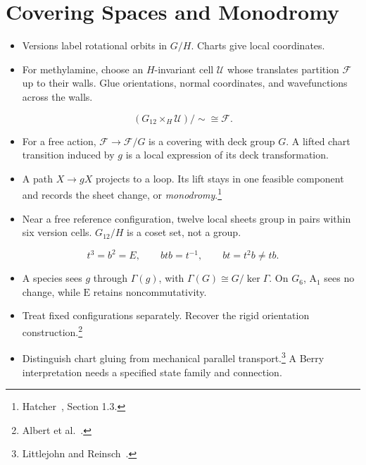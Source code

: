 \documentclass[12pt]{article}
\begin{document}
\section{Covering Spaces and Monodromy}
\begin{itemize}
\item Versions label rotational orbits in $G/H$. Charts give local coordinates.
\item For methylamine, choose an $H$-invariant cell $\mathcal U$ whose
translates partition $\mathcal F$ up to their walls. Glue orientations,
normal coordinates, and wavefunctions across the walls.
\end{itemize}
\[
(G_{12}\times_H\mathcal U)/{\sim}\cong\mathcal F.
\]

\begin{itemize}
\item For a free action, $\mathcal F\to\mathcal F/G$ is a covering
with deck group $G$. A lifted chart transition induced by $g$
is a local expression of its deck transformation.
\item A path $X\to gX$ projects to a loop. Its lift stays in one
feasible component and records the sheet change, or
\emph{monodromy}.\footnote{Hatcher~\cite{Hatcher2002}, Section 1.3.}
\item Near a free reference configuration, twelve local sheets group
in pairs within six version cells. $G_{12}/H$ is a coset set, not a group.
\end{itemize}
\[
t^3=b^2=E,\qquad btb=t^{-1},\qquad bt=t^2b\ne tb.
\]

\begin{itemize}
\item A species sees $g$ through $\Gamma(g)$, with
$\Gamma(G)\cong G/\ker\Gamma$. On $G_6$, $\mathrm A_1$ sees no change,
while $\mathrm E$ retains noncommutativity.
\item Treat fixed configurations separately. Recover the rigid
orientation construction.\footnote{Albert et al.\ \cite{AlbertEtAlOrientation}.}
\item Distinguish chart gluing from mechanical parallel
transport.\footnote{Littlejohn and Reinsch~\cite{LittlejohnReinsch1997}.}
A Berry interpretation needs
a specified state family and connection.
\end{itemize}
\end{document}
